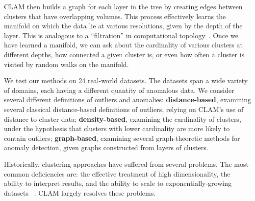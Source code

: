 CLAM then builds a graph for each layer in the tree by creating edges between clusters that have overlapping volumes.
This process effectively learns the manifold on which the data lie at various resolutions, given by the depth of the layer.
This is analogous to a ``filtration'' in computational topology~\cite{carlsson2009topology}.
Once we have learned a manifold, we can ask about the cardinality of various clusters at different depths, how connected a given cluster is, or even how often a cluster is visited by random walks on the manifold.

We test our methods on 24 real-world datasets.
The datasets span a wide variety of domains, each having a different quantity of anomalous data.
We consider several different definitions of outliers and anomalies: \textbf{distance-based}, examining several classical distance-based definitions of outliers, relying on CLAM's use of distance to cluster data; \textbf{density-based}, examining the cardinality of clusters, under the hypothesis that clusters with lower cardinality are more likely to contain outliers; \textbf{graph-based}, examining several graph-theoretic methods for anomaly detection, given graphs constructed from layers of clusters.

Historically, clustering approaches have suffered from several problems.
The most common deficiencies are: the effective treatment of high dimensionality, the ability to interpret results, and the ability to scale to exponentially-growing datasets ~\cite{agrawal1998automatic}.
CLAM largely resolves these problems.

